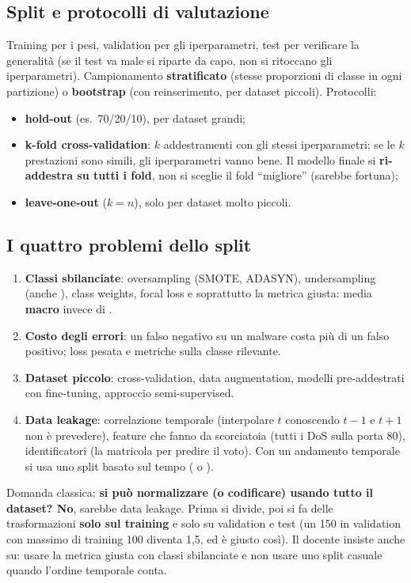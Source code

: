 \subsection{Split e protocolli di valutazione}
Training per i pesi, validation per gli iperparametri, test per verificare la generalità (se il
test va male si riparte da capo, non si ritoccano gli iperparametri). Campionamento
\textbf{stratificato} (stesse proporzioni di classe in ogni partizione) o \textbf{bootstrap} (con
reinserimento, per dataset piccoli). Protocolli:
\begin{itemize}
  \item \textbf{hold-out} (es.\ 70/20/10), per dataset grandi;
  \item \textbf{k-fold cross-validation}: $k$ addestramenti con gli stessi iperparametri; se le $k$
    prestazioni sono simili, gli iperparametri vanno bene. Il modello finale si \textbf{ri-addestra su
    tutti i fold}, non si sceglie il fold ``migliore'' (sarebbe fortuna);
  \item \textbf{leave-one-out} ($k=n$), solo per dataset molto piccoli.
\end{itemize}

\subsection{I quattro problemi dello split}
\begin{enumerate}
  \item \textbf{Classi sbilanciate}: oversampling (SMOTE, ADASYN), undersampling (anche
    ), class weights, focal loss e soprattutto la metrica giusta: media
    \textbf{macro} invece di .
  \item \textbf{Costo degli errori}: un falso negativo su un malware costa più di un falso positivo;
    loss pesata e metriche sulla classe rilevante.
  \item \textbf{Dataset piccolo}: cross-validation, data augmentation, modelli pre-addestrati con
    fine-tuning, approccio semi-supervised.
  \item \textbf{Data leakage}: correlazione temporale (interpolare $t$ conoscendo $t-1$ e $t+1$ non è
    prevedere), feature che fanno da scorciatoia (tutti i DoS sulla porta 80), identificatori (la
    matricola per predire il voto). Con un andamento temporale si usa uno split basato sul tempo
    ( o ).
\end{enumerate}

\begin{esame}
Domanda classica: \textbf{si può normalizzare (o codificare) usando tutto il dataset? No}, sarebbe
data leakage. Prima si divide, poi si fa  delle trasformazioni \textbf{solo sul training}
e solo  su validation e test (un 150 in validation con massimo di training 100
diventa 1,5, ed è giusto così). Il docente insiste anche su: usare la metrica giusta con classi
sbilanciate e non usare uno split casuale quando l'ordine temporale conta.
\end{esame}

